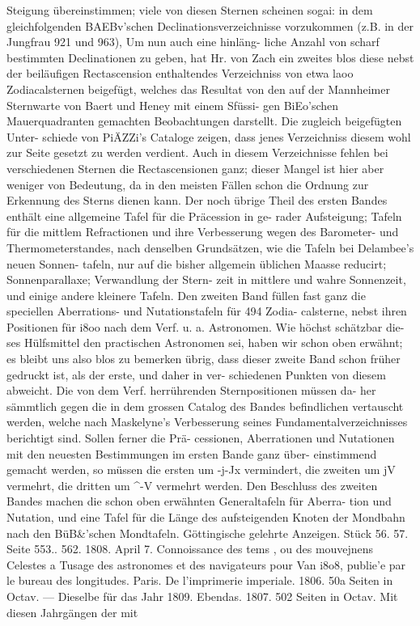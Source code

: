\documentclass[12pt,a4paper]{article}
\begin{document}
Steigung  übereinstimmen;  viele  von  diesen  Sternen  scheinen  sogai:  in  dem  gleichfolgenden  BAEBv'schen Declinationsverzeichnisse  vorzukommen  (z.B.  in  der  Jungfrau  921  und  963),  Um  nun  auch  eine  hinläng- liche Anzahl  von  scharf  bestimmten  Declinationen  zu  geben,  hat  Hr.  von  Zach  ein  zweites  blos  diese nebst  der  beiläufigen  Rectascension  enthaltendes  Verzeichniss  von  etwa  laoo  Zodiacalsternen  beigefügt, welches  das  Resultat  von  den  auf  der  Mannheimer  Sternwarte  von  Baert  und  Heney  mit  einem  Sfüssi- gen  BiEo'schen  Mauerquadranten  gemachten  Beobachtungen  darstellt.  Die  zugleich  beigefügten  Unter- schiede von  PiÄZZi's  Cataloge  zeigen,  dass  jenes  Verzeichniss  diesem  wohl  zur  Seite  gesetzt  zu  werden verdient.  Auch  in  diesem  Verzeichnisse  fehlen  bei  verschiedenen  Sternen  die  Rectascensionen  ganz; dieser  Mangel  ist  hier  aber  weniger  von  Bedeutung,  da  in  den  meisten  Fällen  schon  die  Ordnung  zur Erkennung  des  Sterns  dienen  kann. Der  noch  übrige  Theil  des  ersten  Bandes  enthält  eine  allgemeine  Tafel  für  die  Präcession  in  ge- rader Aufsteigung;  Tafeln  für  die  mittlem  Refractionen  und  ihre  Verbesserung  wegen  des  Barometer- und  Thermometerstandes,  nach  denselben  Grundsätzen,  wie  die  Tafeln  bei  Delambee's  neuen  Sonnen- tafeln, nur  auf  die  bisher  allgemein  üblichen  Maasse  reducirt;  Sonnenparallaxe;  Verwandlung  der  Stern- zeit in  mittlere  und  wahre  Sonnenzeit,  und  einige  andere  kleinere  Tafeln. Den  zweiten  Band  füllen  fast  ganz  die  speciellen  Aberrations-  und  Nutationstafeln  für  494  Zodia- calsterne,  nebst  ihren  Positionen  für  i8oo  nach  dem  Verf.  u.  a.  Astronomen.  Wie  höchst  schätzbar  die- ses Hülfsmittel  den  practischen  Astronomen  sei,  haben  wir  schon  oben  erwähnt;  es  bleibt  uns  also  blos zu  bemerken  übrig,  dass  dieser  zweite  Band  schon  früher  gedruckt  ist,  als  der  erste,  und  daher  in  ver- schiedenen Punkten  von  diesem  abweicht.  Die  von  dem  Verf.  herrührenden  Sternpositionen  müssen  da- her sämmtlich  gegen  die  in  dem  grossen  Catalog  des  Bandes  befindlichen  vertauscht  werden,  welche nach  Maskelyne's  Verbesserung  seines  Fundamentalverzeichnisses  berichtigt  sind.  Sollen  ferner  die  Prä- cessionen,  Aberrationen  und  Nutationen  mit  den  neuesten  Bestimmungen  im  ersten  Bande  ganz  über- einstimmend gemacht  werden,  so  müssen  die  ersten  um  -j-Jx  vermindert,  die  zweiten  um  jV  vermehrt, die  dritten  um  \textasciicircum{}-V  vermehrt  werden. Den  Beschluss  des  zweiten  Bandes  machen  die  schon  oben  erwähnten  Generaltafeln  für  Aberra- tion und  Nutation,  und  eine  Tafel  für  die  Länge  des  aufsteigenden  Knoten  der  Mondbahn  nach  den BüB\&'schen  Mondtafeln. Göttingische  gelehrte  Anzeigen.  Stück  56.  57.  Seite  553.. 562.     1808.  April  7. Connoissance  des  tems ,  ou  des  mouvejnens  Celestes  a  Tusage  des  astronomes  et  des  navigateurs  pour Van  i8o8,  publie'e  par  le  bureau  des  longitudes.  Paris.  De  l'imprimerie  imperiale.  1806.  50a  Seiten in  Octav.  ---     Dieselbe  für  das  Jahr  1809.     Ebendas.  1807.     502  Seiten  in  Octav. Mit  diesen  Jahrgängen  der  mit  
\end{document}
